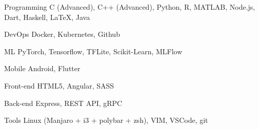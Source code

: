 
\begin{cvskills}

\cvskill
    {Programming}
    {C (Advanced), C++ (Advanced), Python, R, MATLAB, Node.js, Dart, Haskell, LaTeX, Java}

\cvskill
    {DevOps}
    {Docker, Kubernetes, Github}

\cvskill
    {ML}
    {PyTorch, Tensorflow, TFLite, Scikit-Learn, MLFlow}

\cvskill
    {Mobile}
    {Android, Flutter}

\cvskill
    {Front-end}
    {HTML5, Angular, SASS}

\cvskill
    {Back-end}
    {Express, REST API, gRPC}

\cvskill
    {Tools}
    {Linux (Manjaro + i3 + polybar + zsh), VIM, VSCode, git}

\end{cvskills}